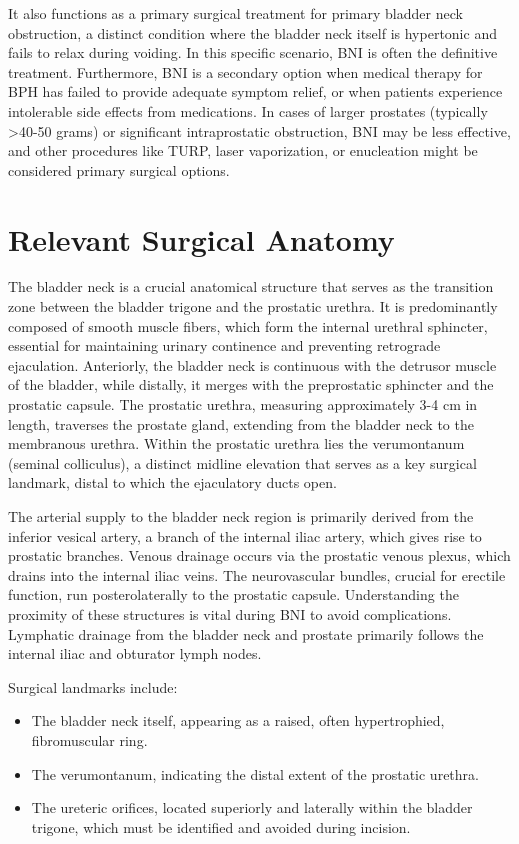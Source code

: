 It also functions as a primary surgical treatment for primary bladder neck obstruction, a distinct condition where the bladder neck itself is hypertonic and fails to relax during voiding. In this specific scenario, BNI is often the definitive treatment. Furthermore, BNI is a secondary option when medical therapy for BPH has failed to provide adequate symptom relief, or when patients experience intolerable side effects from medications. In cases of larger prostates (typically >40-50 grams) or significant intraprostatic obstruction, BNI may be less effective, and other procedures like TURP, laser vaporization, or enucleation might be considered primary surgical options.

\section*{Relevant Surgical Anatomy}
The bladder neck is a crucial anatomical structure that serves as the transition zone between the bladder trigone and the prostatic urethra. It is predominantly composed of smooth muscle fibers, which form the internal urethral sphincter, essential for maintaining urinary continence and preventing retrograde ejaculation. Anteriorly, the bladder neck is continuous with the detrusor muscle of the bladder, while distally, it merges with the preprostatic sphincter and the prostatic capsule. The prostatic urethra, measuring approximately 3-4 cm in length, traverses the prostate gland, extending from the bladder neck to the membranous urethra. Within the prostatic urethra lies the verumontanum (seminal colliculus), a distinct midline elevation that serves as a key surgical landmark, distal to which the ejaculatory ducts open.

The arterial supply to the bladder neck region is primarily derived from the inferior vesical artery, a branch of the internal iliac artery, which gives rise to prostatic branches. Venous drainage occurs via the prostatic venous plexus, which drains into the internal iliac veins. The neurovascular bundles, crucial for erectile function, run posterolaterally to the prostatic capsule. Understanding the proximity of these structures is vital during BNI to avoid complications. Lymphatic drainage from the bladder neck and prostate primarily follows the internal iliac and obturator lymph nodes.

Surgical landmarks include:

\begin{itemize}
  \item The bladder neck itself, appearing as a raised, often hypertrophied, fibromuscular ring.
  \item The verumontanum, indicating the distal extent of the prostatic urethra.
  \item The ureteric orifices, located superiorly and laterally within the bladder trigone, which must be identified and avoided during incision.
\end{itemize}

